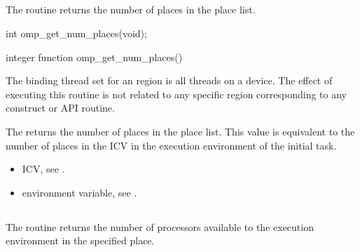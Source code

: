 
\subsection{}
\label{subsec:omp_get_num_places}
\summary
The  routine returns the number of places in the place list.

\format
\ccppspecificstart
\begin{boxedcode}
int omp\_get\_num\_places(void);
\end{boxedcode}
\ccppspecificend

\fortranspecificstart
\begin{boxedcode}
integer function omp\_get\_num\_places()
\end{boxedcode}
\fortranspecificend

\binding
The binding thread set for an   region is all threads on a device. The effect of executing this routine is not related to any specific region corresponding to any construct or API routine.

\effect

The  returns the number of places in the place list. This value is equivalent to the number of places in the   ICV in the execution environment of the initial task.

\crossreferences
\begin{itemize}
\item {} ICV, see 
.

\item {} environment variable, see 
.
\end{itemize}





\subsection{}
\label{subsec:omp_get_place_num_procs}

\summary
The   routine returns the number of processors available to the execution environment in the specified place.

